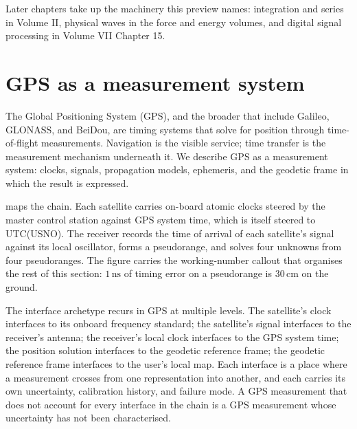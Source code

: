 Later chapters take up the machinery this preview names: integration
and series in Volume II, physical waves in the force and energy
volumes, and digital signal processing in Volume VII Chapter 15.

\section{GPS as a measurement system}

The Global Positioning System (GPS), and the broader
 that include
Galileo, GLONASS, and BeiDou, are timing systems that solve for
position through time-of-flight measurements. Navigation is the
visible service; time transfer is the measurement mechanism
underneath it. We describe GPS as a measurement system: clocks,
signals, propagation models, ephemeris, and the geodetic frame in
which the result is expressed.



 maps the chain. Each
satellite carries on-board atomic clocks steered by the master
control station against GPS system time, which is itself steered
to UTC(USNO). The receiver records the time of arrival of each
satellite's signal against its local oscillator, forms a
pseudorange, and solves four unknowns from four pseudoranges. The
figure carries the working-number callout that organises the rest
of this section: $1 \,\si{\nano\second}$ of timing error on a
pseudorange is $30 \,\si{\centi\meter}$ on the ground.

\begin{archetype}
The interface archetype recurs in GPS at multiple levels. The
satellite's clock interfaces to its onboard frequency standard; the
satellite's signal interfaces to the receiver's antenna; the
receiver's local clock interfaces to the GPS system time; the
position solution interfaces to the geodetic reference frame; the
geodetic reference frame interfaces to the user's local map. Each
interface is a place where a measurement crosses from one
representation into another, and each carries its own uncertainty,
calibration history, and failure mode. A GPS measurement that does
not account for every interface in the chain is a GPS measurement
whose uncertainty has not been characterised.
\end{archetype}


